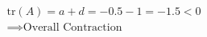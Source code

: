 \documentclass[preview]{standalone}
\begin{document}
\begin{align*}
\text{tr}(A) = a+d = -0.5 - 1 = -1.5 < 0 \\ \implies \text{Overall Contraction}
\end{align*}
\end{document}
